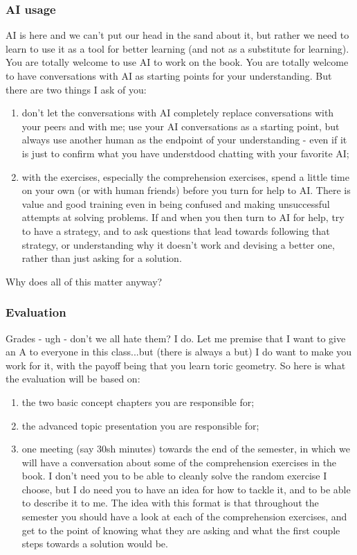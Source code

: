 \subsubsection*{AI usage}
AI is here and we can't put our head in the sand about it, but rather we need to learn to use it as a tool for better learning (and not as a substitute for learning).
You are totally welcome to use AI to work on the book. You are totally welcome to have conversations with AI as starting points for your understanding.
But there are two things I ask of you:
\begin{enumerate}
    \item don't let the conversations with AI completely replace conversations with your peers and with me; use your AI conversations as a starting point, but always use another human as the endpoint of your understanding - even if it is just to confirm what you have understdood chatting with your favorite AI;
    \item with the exercises, especially the comprehension exercises, spend a little time on your own (or with human friends) before you turn for help to AI. There is value and good training even in being confused and making unsuccessful attempts at solving problems. If and when you then turn to AI for help, try to have a strategy, and to ask questions that lead towards following that strategy, or understanding why it doesn't work and devising a better one, rather than just asking for a solution.
\end{enumerate}
Why does all of this matter anyway?
\subsubsection*{Evaluation}
Grades - ugh - don't we all hate them? I do. Let me premise that I want to give an A to everyone in this class...but (there is always a but) I do want to make you work for it, with the payoff being that you learn toric geometry. So here is what the evaluation will be based on:
\begin{enumerate}
    \item the two basic concept chapters you are responsible for;
    \item the advanced topic presentation you are responsible for;
    \item one meeting (say 30sh minutes) towards the end of the semester, in which we will have a conversation about some of the comprehension exercises in the book. I don't need you to be able to cleanly solve the random exercise I choose, but I do need you to have an idea for how to tackle it, and to be able to describe it to me. The idea with this format is that throughout the semester you should have a look at each of the comprehension exercises, and get to the point of knowing what they are asking and what the first couple steps towards a solution would be.
\end{enumerate}





